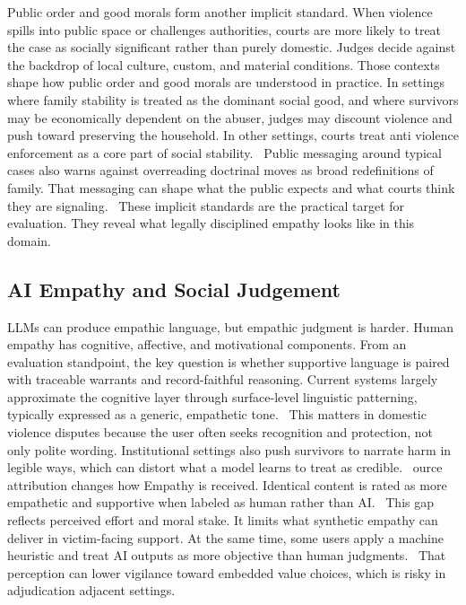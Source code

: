 \documentclass[pdflatex,sn-mathphys-ay]{sn-jnl}%
\theoremstyle{thmstyleone}%
\theoremstyle{thmstyletwo}%
\theoremstyle{thmstylethree}%
\begin{document}
Public order and good morals form another implicit standard. When violence spills into public space or challenges authorities, courts are more likely to treat the case as socially significant rather than purely domestic. Judges decide against the backdrop of local culture, custom, and material conditions. Those contexts shape how public order and good morals are understood in practice. In settings where family stability is treated as the dominant social good, and where survivors may be economically dependent on the abuser, judges may discount violence and push toward preserving the household. In other settings, courts treat anti violence enforcement as a core part of social stability.~\cite{he_threat_2025-1} Public messaging around typical cases also warns against overreading doctrinal moves as broad redefinitions of family. That messaging can shape what the public expects and what courts think they are signaling.~\cite{wang_cohabitation_2025} These implicit standards are the practical target for evaluation. They reveal what legally disciplined empathy looks like in this domain.

\subsection{AI Empathy and Social Judgement}\label{subsec2}

LLMs can produce empathic language, but empathic judgment is harder. Human empathy has cognitive, affective, and motivational components. From an evaluation standpoint, the key question is whether supportive language is paired with traceable warrants and record-faithful reasoning. Current systems largely approximate the cognitive layer through surface-level linguistic patterning, typically expressed as a generic, empathetic tone.~\cite{rubin_considering_2024} This matters in domestic violence disputes because the user often seeks recognition and protection, not only polite wording. Institutional settings also push survivors to narrate harm in legible ways, which can distort what a model learns to treat as credible.~\cite{sweet_paradox_2019} ource attribution changes how Empathy is received. Identical content is rated as more empathetic and supportive when labeled as human rather than AI.~\cite{rubin_comparing_2025} This gap reflects perceived effort and moral stake. It limits what synthetic empathy can deliver in victim-facing support. At the same time, some users apply a machine heuristic and treat AI outputs as more objective than human judgments.~\cite{flanagan_rule_2025-2} That perception can lower vigilance toward embedded value choices, which is risky in adjudication adjacent settings.
\end{document}

